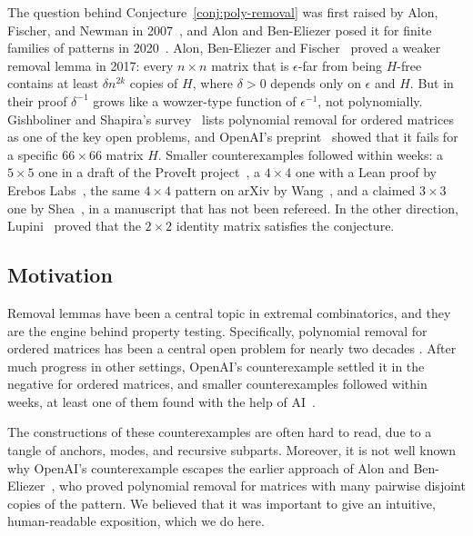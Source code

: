 \documentclass{article}
\theoremstyle{plain}
\theoremstyle{definition}
\begin{document}
The question behind Conjecture~\ref{conj:poly-removal} was first raised by Alon, Fischer, and Newman in 2007~\cite{AFN}, and Alon and Ben-Eliezer posed it for finite families of patterns in 2020~\cite{ABE}. Alon, Ben-Eliezer and Fischer~\cite{ABF17} proved a weaker removal lemma in 2017: every $n \times n$ matrix that is $\epsilon$-far from being $H$-free contains at least $\delta n^{2k}$ copies of $H$, where $\delta > 0$ depends only on $\epsilon$ and $H$. But in their proof $\delta^{-1}$ grows like a wowzer-type function of $\epsilon^{-1}$, not polynomially. Gishboliner and Shapira's survey~\cite{GS} lists polynomial removal for ordered matrices as one of the key open problems, and OpenAI's preprint~\cite{openai} showed that it fails for a specific $66 \times 66$ matrix $H$. Smaller counterexamples followed within weeks: a $5 \times 5$ one in a draft of the ProveIt project~\cite{proveit}, a $4 \times 4$ one with a Lean proof by Erebos Labs~\cite{erebos}, the same $4 \times 4$ pattern on arXiv by Wang~\cite{wang}, and a claimed $3 \times 3$ one by Shea~\cite{shea}, in a manuscript that has not been refereed. In the other direction, Lupini~\cite{Lupini} proved that the $2 \times 2$ identity matrix satisfies the conjecture. 

\subsection*{Motivation}
Removal lemmas have been a central topic in extremal combinatorics, and they are the engine behind property testing. Specifically, polynomial removal for ordered matrices has been a central open problem for nearly two decades \cite{AFN,ABE,GS}. After much progress in other settings, OpenAI's counterexample settled it in the negative for ordered matrices, and smaller counterexamples followed within weeks, at least one of them found with the help of AI~\cite{shea}.

The constructions of these counterexamples are often hard to read, due to a tangle of anchors, modes, and recursive subparts. Moreover, it is not well known why OpenAI's counterexample escapes the earlier approach of Alon and Ben-Eliezer~\cite{ABE}, who proved polynomial removal for matrices with many pairwise disjoint copies of the pattern. We believed that it was important to give an intuitive, human-readable exposition, which we do here.
\end{document}
